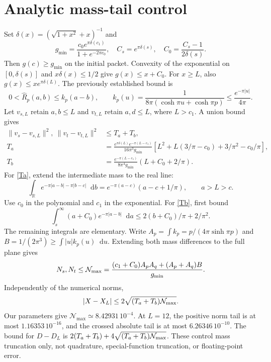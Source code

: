 \documentclass[11pt,a4paper]{article}
\newcommand{\dd}{\mathop{}\!\mathrm d}
\newcommand{\RR}{\widehat R}
\begin{document}
\section{Analytic mass-tail control}
Set $\delta(x)=(\sqrt{1+x^2}+x)^{-1}$ and
\[
 g_{\min}=\frac{c_0e^{\pi\delta(c_1)}}{1+e^{-2\pi c_0}},
 \quad C_s=e^{\pi\delta(s)},\quad C_0=\frac{C_s-1}{2\delta(s)}.
\]
Then $g(c)\ge g_{\min}$ on the initial packet.
Convexity of the exponential on $[0,\delta(s)]$ and
$x\delta(x)\le1/2$ give $g(x)\le x+C_0$.
For $x\ge L$, also $g(x)\le x e^{\pi\delta(L)}$.
The previously established bound is
\[
 0<\RR_p(a,b)\le k_p(a-b),\qquad
 k_p(u)=\frac1{8\pi(\cosh\pi u+\cosh\pi p)}
       \le\frac{e^{-\pi|u|}}{4\pi}.
\]
Let $v_{s,L}$ retain $a,b\le L$ and $v_{t,L}$ retain $a,d\le L$,
where $L>c_1$. A union bound gives
\begin{align}
 \|v_s-v_{s,L}\|^2,\ \|v_t-v_{t,L}\|^2&\le T_a+T_b,\\
 T_a&=\frac{e^{\pi\delta(L)}e^{-\pi(L-c_1)}}{16\pi^3g_{\min}}
 \left[L^2+L(3/\pi-c_0)+3/\pi^2-c_0/\pi\right], \label{Ta}\\
 T_b&=\frac{e^{-\pi(L-c_1)}}{8\pi^4g_{\min}}
                 (L+C_0+2/\pi). \label{Tb}
\end{align}
For \eqref{Ta}, extend the intermediate mass to the real line:
\[
 \int_{\mathbb R}e^{-\pi|a-b|-\pi|b-c|}\dd b
 =e^{-\pi(a-c)}(a-c+1/\pi),\qquad a>L>c.
\]
Use $c_0$ in the polynomial and $c_1$ in the exponential.
For \eqref{Tb}, first bound
\[
 \int_s^\infty(a+C_0)e^{-\pi|a-b|}\dd a
 \le 2(b+C_0)/\pi+2/\pi^2.
\]
The remaining integrals are elementary.
Write $A_p=\int k_p=p/(4\pi\sinh\pi p)$ and
$B=1/(2\pi^3)\ge\int |u|k_p(u)\dd u$. Extending both mass differences
to the full plane gives
\begin{equation}
 N_s,N_t\le{\cal N}_{\max}
 =\frac{(c_1+C_0)A_pA_q+(A_p+A_q)B}{g_{\min}}.
\end{equation}
Independently of the numerical norms,
\begin{equation}
 |X-X_L|\le2\sqrt{(T_a+T_b){\cal N}_{\max}}. \label{Xtail}
\end{equation}
Our parameters give $\mathcal N_{\max}\simeq8.42931\,10^{-4}$.
At $L=12$, the positive norm tail is at most $1.16353\,10^{-16}$,
and the crossed absolute tail is at most $6.26346\,10^{-10}$.
The bound for $D-D_L$ is
$2(T_a+T_b)+4\sqrt{(T_a+T_b){\cal N}_{\max}}$.
These control mass truncation only, not quadrature,
special-function truncation, or floating-point error.
\end{document}
